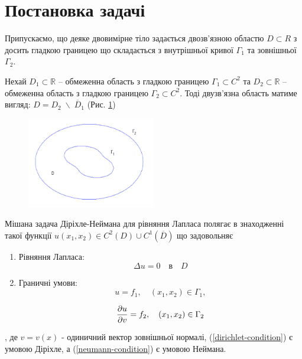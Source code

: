 \documentclass[14pt,a4paper]{extarticle}
\newcounter{e}
\begin{document}
	\newpage
	\thispagestyle{empty}
	\section{Постановка задачі}
	
	Припускаємо, що деяке двовимірне тіло задається двозв'язною областю $D \subset R$ з досить гладкою границею що складається з внутрішньої кривої $\Gamma_1$ та зовнішньої $\Gamma_2$. 
	
	Нехай $D_1 \subset 	\mathbb{R}$ – обмеженна область з гладкою границею $\Gamma_1 \subset   C^2$ та $D_2 \subset \mathbb{R}$ – обмеженна область з гладкою границею $\Gamma_2 \subset C^2$. Тоді двузв'язна область матиме вигляд: $D = D_2 \; \backslash \; \overline{D}_1$ (Рис. \ref{fig:double-connected-region})

	\begin{figure}[h]
		\centering
		\includegraphics[width=0.5\textwidth]{resources/doubly-connected-region}
		\caption{}
		\label{fig:double-connected-region}
	\end{figure}

	Мішана задача Діріхле-Неймана для рівняння Лапласа полягає в знаходженні такої функції $u(x_1, x_2) \in C^{2}(D) \cup  C^{1}(\overline{D})$ що задовольняє

	\begin{enumerate}
		\item
		Рівняння Лапласа: 
		\begin{equation}
			\Delta{u} = 0 \quad \text{в} \quad D
		\end{equation}

		\item
		Граничні умови:
		\begin{equation}
			\label{dirichlet-condition}
			u = f_1, \quad (x_1, x_2) \in \Gamma_1,
		\end{equation}
	
		\begin{equation}
			\label{neumann-condition}
			\pdv{u}{v} = f_2, \quad (x_1, x_2) \in \Gamma_2 		
		\end{equation}

	\end{enumerate}
	, де $v = v(x)$ - одиничний вектор зовнішньої нормалі, (\ref{dirichlet-condition}) є умовою Діріхле, а (\ref{neumann-condition}) є умовою Неймана.
\end{document}
